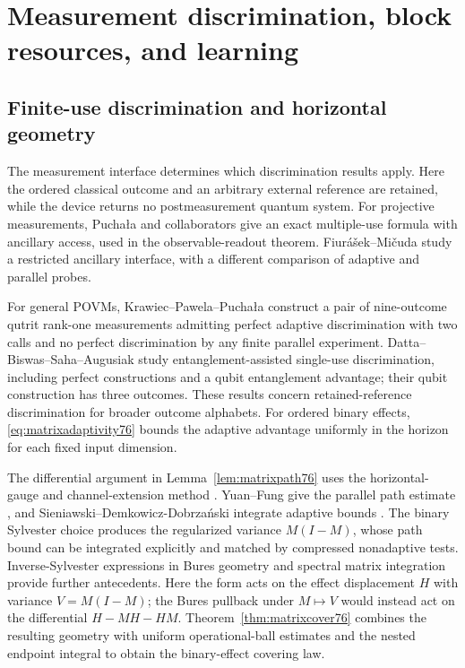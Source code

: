 \section{Measurement discrimination, block resources, and learning}
\label{sec:matrixcomparison76}
\label{sec:blockcomparison78}
\label{sec:confidencecomparison80}

\subsection{Finite-use discrimination and horizontal geometry}
The measurement interface determines which discrimination results
apply.  Here the ordered classical outcome and an arbitrary external
reference are retained, while the device returns no postmeasurement
quantum system.  For projective measurements, Pucha\l a and
collaborators \cite[Corollary~1 and Theorem~2]{PPKKO72} give an
exact multiple-use formula with ancillary access, used in the
observable-readout theorem.  Fiur\'a\v sek--Mi\v cuda \cite{FM75}
study a restricted ancillary interface, with a different comparison
of adaptive and parallel probes.

For general POVMs, Krawiec--Pawela--Pucha\l a
\cite[Section~4]{KPP76} construct a pair of nine-outcome qutrit
rank-one measurements admitting perfect adaptive discrimination
with two calls and no perfect discrimination by any finite parallel
experiment.  Datta--Biswas--Saha--Augusiak
\cite[Theorems~3--5]{DBSA76} study entanglement-assisted single-use
discrimination, including perfect constructions and a qubit
entanglement advantage; their qubit construction has three outcomes.
These results concern retained-reference discrimination for broader
outcome alphabets.  For ordered binary effects,
\eqref{eq:matrixadaptivity76} bounds the adaptive advantage uniformly
in the horizon for each fixed input dimension.

The differential argument in Lemma~\ref{lem:matrixpath76} uses the
horizontal-gauge and channel-extension method
\cite{FI76,DKG67,DM76,KGAD76}.  Yuan--Fung give the parallel path
estimate \cite[Section~III, equation~(26), PDF version~3]{YF76},
and Sieniawski--Demkowicz-Dobrza\'nski integrate adaptive bounds
\cite[Section~IV.A]{SD76}.  The binary Sylvester choice produces
the regularized variance $M(I-M)$, whose path bound can be
integrated explicitly and matched by compressed nonadaptive tests.
Inverse-Sylvester expressions in Bures geometry
\cite{Dittmann76} and spectral matrix integration
\cite{SZGeom76} provide further antecedents.  Here the form acts on
the effect displacement $H$ with variance $V=M(I-M)$; the Bures
pullback under $M\mapsto V$ would instead act on the differential
$H-MH-HM$.  Theorem~\ref{thm:matrixcover76} combines the resulting
geometry with uniform operational-ball estimates and the nested
endpoint integral to obtain the binary-effect covering law.

